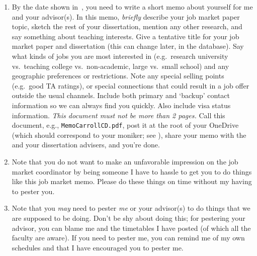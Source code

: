 \documentclass{\classes/econtex}
\begin{document}
\begin{enumerate}
  \hypertarget{write-and-post-memo}{}
\item {} By the date shown in~\timet, you need to write a short memo about yourself for me and your advisor(s).  In this memo, \textit{briefly} describe your job market paper topic, sketch the rest of your dissertation, mention any other research, and say something about teaching interests.  Give a tentative title for your job market paper and dissertation (this can change later, in the database).  Say what kinds of jobs you are most interested in (e.g.\ research university vs.\ teaching college vs.\ non-academic, large vs.\ small school) and any geographic preferences or restrictions.  Note any special selling points (e.g.\ good TA ratings), or special connections that could result in a job offer outside the usual channels.  Include both primary and `backup' contact information so we can always find you quickly.  Also include visa status information.  \textit{This document must not be more than 2 pages.}  Call this document, e.g., \texttt{MemoCarrollCD.pdf}, post it at the root of your OneDrive (which should correspond to your moniker; see \ntn), share your memo with the \JMPO and your dissertation advisers, and you're done.

\item Note that you do not want to make an unfavorable impression on
  the job market coordinator by being someone I have to hassle to get
  you to do things like this job market memo.  Please do these things
  on time without my having to pester you.

  \hypertarget{Pester}{}
\item Note that you \textit{may} need to pester \textit{me} or your advisor(s) to do things
  that we are supposed to be doing.  Don't be shy about doing this; for pestering
  your advisor, you can blame me and the timetables I have posted (of which all the
  faculty are aware).  If you need to pester me, you can remind me of my own
  schedules and that I have encouraged you to pester me.


\end{enumerate}
\end{document}
